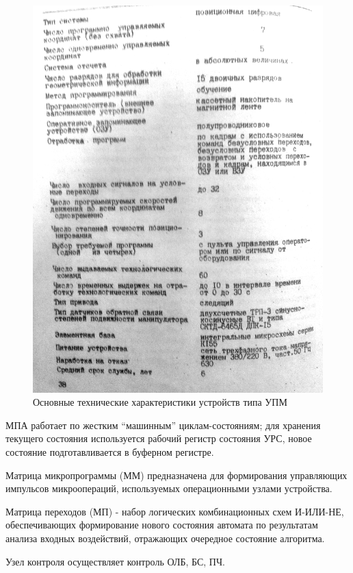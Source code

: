 \begin{figure}[ht]
    \includegraphics[width=1\linewidth]{Figures/table.png}
    \caption{Основные технические характеристики устройств типа УПМ}
    \label{fig:table}
\end{figure}

МПА работает по жестким ``машинным'' циклам-состояниям; для хранения текущего состояния используется рабочий регистр состояния УРС, новое состояние подготавливается в буферном регистре.

Матрица микропрограммы (ММ) предназначена для формирования управляющих импульсов микроопераций, используемых операционными узлами устройства.

Матрица переходов (МП) - набор логических комбинационных схем И-ИЛИ-НЕ, обеспечивающих формирование нового состояния автомата по результатам анализа входных воздействий, отражающих очередное состояние алгоритма.

Узел контроля осуществляет контроль ОЛБ, БС, ПЧ.
